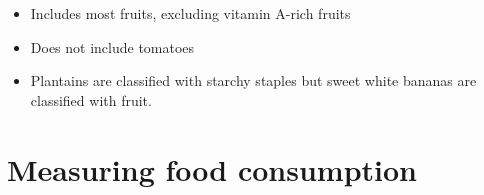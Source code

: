 \documentclass[12pt,]{book}
\providecommand{\tightlist}{%
  \setlength{\itemsep}{0pt}\setlength{\parskip}{0pt}}
\theoremstyle{definition}
\theoremstyle{definition}
\theoremstyle{definition}
\theoremstyle{remark}
\begin{document}
\begin{itemize}
\tightlist
\item
  Includes most fruits, excluding vitamin A-rich fruits
\item
  Does not include tomatoes
\item
  Plantains are classified with starchy staples but sweet white bananas
  are classified with fruit.
\end{itemize}

\hypertarget{food}{%
\chapter{Measuring food consumption}\label{food}}


\end{document}
